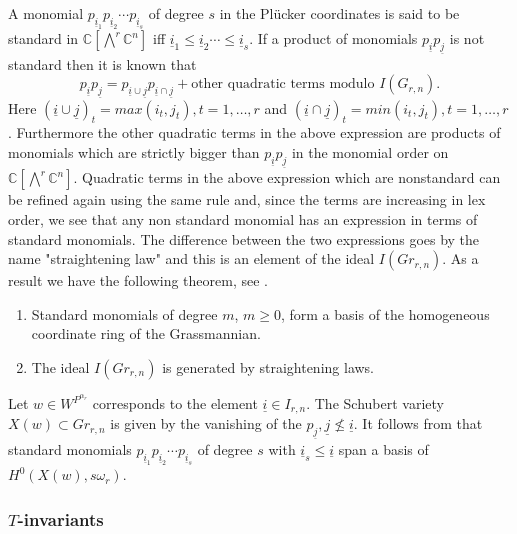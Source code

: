  A monomial $p_{{\underline{i}}_1} p_{{\underline{i}}_2} \cdots p_{{\underline{i}}_s}$ of degree $s$ in the Pl\"{u}cker coordinates is said to be standard in ${\mathbb C}[\bigwedge^r {\mathbb C}^n]$ iff 
 ${\underline{i}}_1 \leq {\underline{i}}_2 \cdots \leq {\underline{i}}_s$.  If a product of monomials $p_{\underline{i}} p_{\underline{j}}$ is not standard then it is known that 
 \[ p_{\underline{i}} p_{\underline{j}} = p_{\underline{i} \cup \underline{j}}p_{\underline{i} \cap \underline{j}} + \text{other quadratic terms\ \ } \text{modulo\ \ }  I(G_{r,n}). \]
 Here $({\underline{i} \cup \underline{j}})_t = max(i_t, j_t), t = 1,\ldots,r$ and  $({\underline{i} \cap \underline{j}})_t = min (i_t, j_t), t = 1,\ldots,r$. 
 Furthermore the other quadratic terms in the above expression are products of monomials which are strictly bigger than $p_{\underline{i}} p_{\underline{j}}$ in the monomial order on ${\mathbb C}[\bigwedge^r {\mathbb C}^n]$. Quadratic terms in the above expression which are nonstandard can be refined again using the same rule and, since the terms are increasing in lex order, we see that any non standard monomial has an expression in terms of standard monomials. The difference between the two expressions goes by the name "straightening law" and this is an element of the ideal $I(Gr_{r,n})$. As a result we have the following theorem, see \cite[Proposition 1.3.6]{seshadriintroduction}.
 
 \begin{theorem} 

\noindent
\begin{enumerate}
 \item Standard monomials of degree $m$, $m \geq 0$, form a basis of the homogeneous coordinate ring of the Grassmannian.
 \item The ideal $I(Gr_{r,n})$ is generated by straightening laws.
 \end{enumerate}
\end{theorem}

Let $w \in W^{P^{\alpha_r}}$ corresponds to the element ${\underline{i}}  \in I_{r,n}$. The Schubert variety $X(w) \subset Gr_{r,n}$ is given by the vanishing of the $p_{\underline{j}}, {\underline{j}} \not \leq  {\underline{i}}$. It follows from \cite[Proposition 1.4.5]{seshadriintroduction} that standard monomials $p_{{\underline{i}}_1} p_{{\underline{i}}_2} \cdots p_{{\underline{i}}_s}$ of degree $s$ with ${\underline{i}}_s \leq {\underline{i}}$ span a basis of $H^0(X(w), s \omega_r)$.


\subsubsection{$T$-invariants}
\label{sec:hb_grass}

